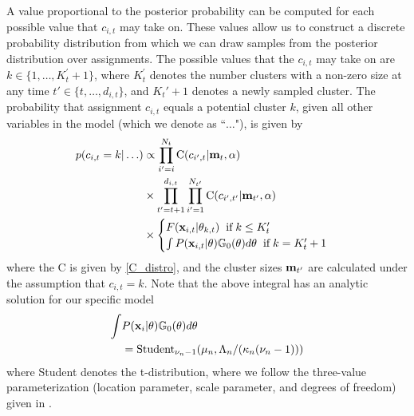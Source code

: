 \documentclass{article}
\begin{document}
A value proportional to the posterior probability can be computed for each possible value that $c_{i,t}$ may take on. These values allow us to construct a discrete probability distribution from which we can draw samples from the posterior distribution over assignments. The possible values that the $c_{i,t}$ may take on are $k \in \{ 1 , \ldots ,  K_{t}^{'}+1 \}$, where $K_{t}^{'}$ denotes the number clusters with a non-zero size at any time $t' \in \{ t, \ldots, d_{i,t} \}$, and $K_{t}'+1$ denotes a newly sampled cluster. The probability that assignment $c_{i,t}$ equals a potential cluster $k$, given all other variables in the model (which we denote as ``$\ldots$"), is given by
\begin{equation}
\label{mcmc_assig_vars}
\begin{split}
p(c_{i,t} = k | \ldots ) & \propto
\prod_{i'=i}^{N_{t}}  \text{C}(c_{i',t} | \bold{m}_{t}, \alpha) \\
& \times \prod_{t' = t+1}^{d_{i,t}}  \prod_{i'=1}^{N_{t'}}   \text{C}(c_{i',t'} | \bold{m}_{t'}, \alpha) \\
 & \times
\begin{cases}
  F(\bold{x}_{i,t} | \theta_{k,t}) \hspace{2mm} \text{if} \hspace{1mm} k \leq K_{t}' \\ %
  \int P(\bold{x}_{i,t} | \theta) \mathbb{G}_{0}(\theta) d\theta \hspace{2mm} \text{if} \hspace{1mm}  k = K_{t}'+1
\end{cases}
\end{split}
\end{equation}
where the C is given by \eqref{C_distro}, and the cluster sizes $\bold{m}_{t'}$ are calculated under the assumption that $c_{i,t} = k$. Note that the above integral has an analytic solution for our specific model
\begin{equation}
\begin{split}
\label{marginal_obs_prob}
\int & P(\bold{x}_{i} | \theta) \mathbb{G}_{0}(\theta)d\theta \\
&= \text{Student}_{\nu_{n} - 1}(\mu_{n}, \Lambda_{n}/(\kappa_{n}(\nu_{n}-1)))
\end{split}
\end{equation}
where Student denotes the t-distribution, where we follow the three-value parameterization (location parameter, scale parameter, and degrees of freedom) given in \cite{gelman2004bayesian}.
\end{document}
